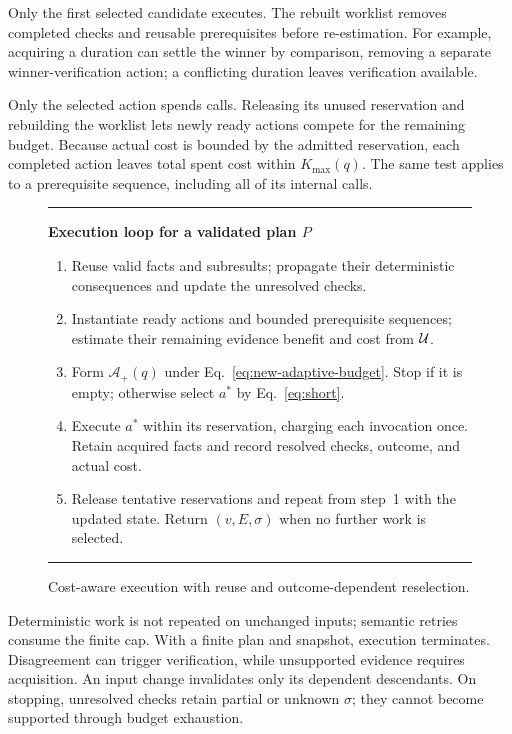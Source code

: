 Only the first selected candidate executes. The rebuilt worklist removes
completed checks and reusable prerequisites before re-estimation. For
example, acquiring a duration can settle the winner by comparison,
removing a separate winner-verification action; a conflicting duration
leaves verification available.

Only the selected action spends calls. Releasing its unused reservation
and rebuilding the worklist lets newly ready actions compete for the
remaining budget. Because actual cost is bounded by the admitted
reservation, each completed action leaves total spent cost within
$K_{\max}(q)$. The same test applies to a prerequisite sequence, including
all of its internal calls.

\begin{figure}[t]
\centering
\begin{minipage}{0.98\columnwidth}
\small
\hrule\smallskip
\textbf{Execution loop for a validated plan $P$}
\begin{enumerate}[leftmargin=*,nosep]
\item Reuse valid facts and subresults; propagate their deterministic
consequences and update the unresolved checks.
\item Instantiate ready actions and bounded prerequisite sequences;
estimate their remaining evidence benefit and cost from $\mathcal{U}$.
\item Form $\mathcal A_+(q)$ under Eq.~\eqref{eq:new-adaptive-budget}.
Stop if it is empty; otherwise select $a^*$ by Eq.~\eqref{eq:short}.
\item Execute $a^*$ within its reservation, charging each invocation once.
Retain acquired facts and record resolved checks, outcome, and actual cost.
\item Release tentative reservations and repeat from step~1 with the
updated state. Return $(v,E,\sigma)$ when no further work is selected.
\end{enumerate}
\smallskip\hrule
\end{minipage}
\caption{Cost-aware execution with reuse and outcome-dependent reselection.}
\label{fig:execution-loop}
\end{figure}

Deterministic work is not repeated on unchanged inputs; semantic retries
consume the finite cap. With a finite plan and snapshot, execution
terminates. Disagreement can trigger verification, while unsupported
evidence requires acquisition. An input change invalidates only its
dependent descendants. On stopping, unresolved checks retain partial or
unknown $\sigma$; they cannot become supported through budget exhaustion.

